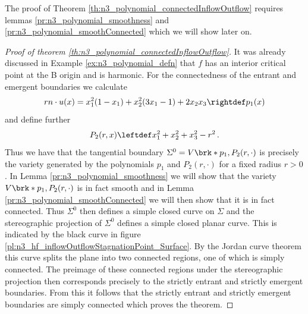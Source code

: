 The proof of Theorem \ref{th:n3_polynomial_connectedInflowOutflow} requires lemmas \ref{pr:n3_polynomial_smoothness} and \ref{pr:n3_polynomial_smoothConnected}
which we will show later on.
\begin{proof}[Proof of theorem {\ref{th:n3_polynomial_connectedInflowOutflow}}]
  It was already discussed in Example \ref{ex:n3_polynomial_defn} that $f$ has an interior critical point at the
  B
  origin and is harmonic.
  For the connectedness of the entrant and emergent boundaries we calculate
  \begin{align}
    rn\cdot u(x) = x_1^2(1-x_1)+x_2^2(3x_1-1)+2x_2x_3\rightdef p_1(x)\label{eq:n3_polynomial_defp1}
  \end{align}
  and define further
  \begin{align}
    P_2(r,x)\leftdef x_1^2+x_2^2+x_3^2-r^2\,.\label{eq:n3_polynomial_defP2}
  \end{align}
  Thus we have that the tangential boundary $\Sigma^0=V\brk*{p_1,P_2(r,\cdot)}$
  is precisely the variety generated by the polynomials $p_1$ and $P_2(r,\cdot)$ for a
  fixed radius $r>0$.
  In Lemma \ref{pr:n3_polynomial_smoothness} we will show that the variety $V\brk*{p_1,P_2(r,\cdot)}$ is in fact smooth
  and in Lemma \ref{pr:n3_polynomial_smoothConnected} we will then show that it is in fact connected.
  Thus $\Sigma^0$ then defines a simple closed curve on $\Sigma$
  and the stereographic projection of $\Sigma^0$ defines a simple closed planar curve.
  This is indicated by the black curve in figure \ref{pl:n3_hf_inflowOutflowStagnationPoint_Surface}.
  By the Jordan curve theorem this curve splits the plane into two connected regions, 
  one of which is simply connected.
  The preimage of these connected regions under the stereographic projection then corresponds
  precisely to the strictly entrant and strictly emergent boundaries.
  From this it follows that the strictly entrant and strictly emergent
  boundaries are simply connected which proves the theorem.
\end{proof}

